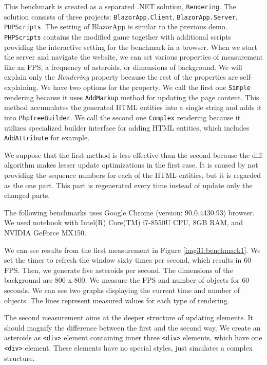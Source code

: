 \par
This benchmark is created as a separated .NET solution, \texttt{Rendering}.
The solution consists of three projects: \texttt{BlazorApp.Client}, \texttt{BlazorApp.Server}, \texttt{PHPScripts}.
The setting of BlazorApp is similar to the previous demo.
\texttt{PHPScripts} contains the modified game together with additional scripts providing the interactive setting for the benchmark in a browser.
When we start the server and navigate the website, we can set various properties of measurement like an FPS, a frequency of asteroids, or dimensions of background.
We will explain only the \textit{Rendering} property because the rest of the properties are self-explaining.
We have two options for the property.
We call the first one \texttt{Simple} rendering because it uses \texttt{AddMarkup} method for updating the page content.
This method accumulates the generated HTML entities into a single string and adds it into \texttt{PhpTreeBuilder}.
We call the second one \texttt{Complex} rendering because it utilizes specialized builder interface for adding HTML entities, which includes \texttt{AddAttribute} for example.
\par
We suppose that the first method is less effective than the second because the diff algorithm makes lesser update optimizations in the first case.
It is caused by not providing the sequence numbers for each of the HTML entities, but it is regarded as the one part.
This part is regenerated every time instead of update only the changed parts.
\par
The following benchmarks uses Google Chrome (version: 90.0.4430.93) browser.
We used notebook with Intel(R) Core(TM) i7-8550U CPU, 8GB RAM, and NVIDIA GeForce MX150.
\par
We can see results from the first measurement in Figure \ref{img31:benchmark1}.
We set the timer to refresh the window sixty times per second, which results in 60 FPS.
Then, we generate five asteroids per second.
The dimensions of the background are 800 x 800.
We measure the FPS and number of objects for 60 seconds.
We can see two graphs displaying the current time and number of objects.
The lines represent measured values for each type of rendering.
\par
The second measurement aims at the deeper structure of updating elements. 
It should magnify the difference between the first and the second way.
We create an asteroids as \texttt{<div>} element containing inner three \texttt{<div>} elements, which have one \texttt{<div>} element.
These elements have no special styles, just simulates a complex structure.
